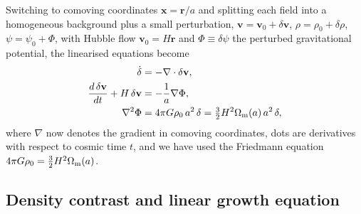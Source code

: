 \documentclass[12pt]{article}
\newcommand{\bx}{\mathbf{x}}
\newcommand{\bv}{\mathbf{v}}
\newcommand{\Omm}{\Omega_{\rm m}}
\begin{document}
Switching to comoving coordinates $\bx = \mathbf{r}/a$ and splitting
each field into a homogeneous background plus a small perturbation,
$\bv = \bv_0 + \delta\bv$,
$\rho = \rho_0 + \delta\rho$,
$\psi = \psi_0 + \Phi$,
with Hubble flow $\bv_0 = H\mathbf{r}$ and $\Phi \equiv \delta\psi$
the perturbed gravitational potential, the linearised equations become
%
\begin{align}
  \dot\delta
    &= -\nabla\cdot\delta\bv,
  \label{eq:continuity_lin}\\
  \frac{d\,\delta\bv}{dt} + H\,\delta\bv
    &= -\frac{1}{a}\nabla\Phi,
  \label{eq:euler_lin}\\
  \nabla^2\Phi
    &= 4\pi G\rho_0\,a^2\,\delta
     = \tfrac{3}{2}H^2\Omm(a)\,a^2\,\delta,
  \label{eq:poisson_lin}
\end{align}
%
where $\nabla$ now denotes the gradient in comoving coordinates, dots
are derivatives with respect to cosmic time $t$, and we have used the
Friedmann equation $4\pi G\rho_0 = \tfrac{3}{2}H^2\Omm(a)$.

\subsection{Density contrast and linear growth equation}
\label{sec:growth}
\end{document}
